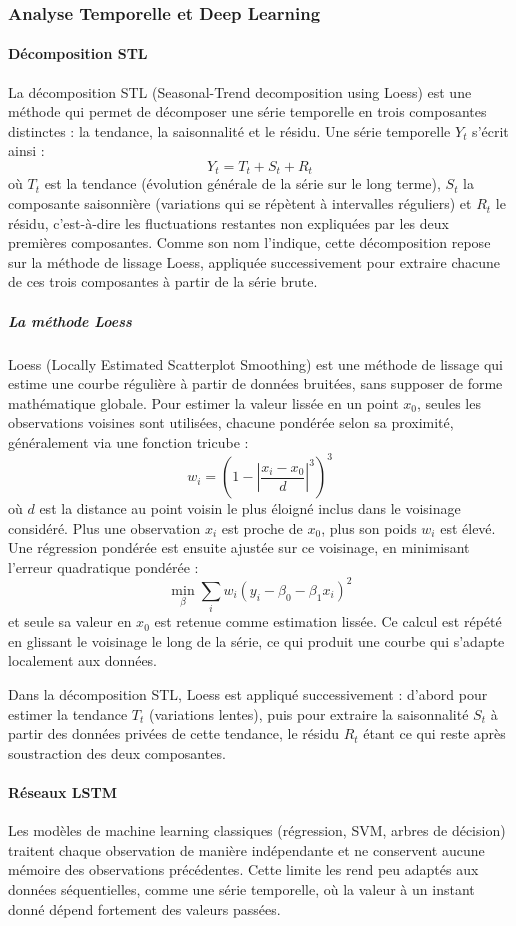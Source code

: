 \documentclass[a4paper,12pt, oneside]{article}
\begin{document}
\subsubsection{Analyse Temporelle et Deep Learning}
\paragraph{Décomposition STL\\}
La décomposition STL (Seasonal-Trend decomposition using Loess) est une méthode qui permet de décomposer une série temporelle en trois composantes distinctes : la tendance, la saisonnalité et le résidu. Une série temporelle $Y_t$ s'écrit ainsi :
\[
Y_t = T_t + S_t + R_t
\]
où $T_t$ est la tendance (évolution générale de la série sur le long terme), $S_t$ la composante saisonnière (variations qui se répètent à intervalles réguliers) et $R_t$ le résidu, c'est-à-dire les fluctuations restantes non expliquées par les deux premières composantes. Comme son nom l'indique, cette décomposition repose sur la méthode de lissage Loess, appliquée successivement pour extraire chacune de ces trois composantes à partir de la série brute.
\subparagraph{La méthode Loess\\}
Loess (Locally Estimated Scatterplot Smoothing) est une méthode de lissage qui estime une courbe régulière à partir de données bruitées, sans supposer de forme mathématique globale. Pour estimer la valeur lissée en un point $x_0$, seules les observations voisines sont utilisées, chacune pondérée selon sa proximité, généralement via une fonction tricube :
\[
w_i = \left(1 - \left|\frac{x_i - x_0}{d}\right|^3\right)^3
\]
où $d$ est la distance au point voisin le plus éloigné inclus dans le voisinage considéré. Plus une observation $x_i$ est proche de $x_0$, plus son poids $w_i$ est élevé. Une régression pondérée est ensuite ajustée sur ce voisinage, en minimisant l'erreur quadratique pondérée :
\[
\min_{\beta} \sum_{i} w_i \left(y_i - \beta_0 - \beta_1 x_i\right)^2
\]
et seule sa valeur en $x_0$ est retenue comme estimation lissée. Ce calcul est répété en glissant le voisinage le long de la série, ce qui produit une courbe qui s'adapte localement aux données.

Dans la décomposition STL, Loess est appliqué successivement : d'abord pour estimer la tendance $T_t$ (variations lentes), puis pour extraire la saisonnalité $S_t$ à partir des données privées de cette tendance, le résidu $R_t$ étant ce qui reste après soustraction des deux composantes.

\paragraph{Réseaux LSTM\\}
Les modèles de machine learning classiques (régression, SVM, arbres de décision) traitent chaque observation de manière indépendante et ne conservent aucune mémoire des observations précédentes. Cette limite les rend peu adaptés aux données séquentielles, comme une série temporelle, où la valeur à un instant donné dépend fortement des valeurs passées.
\end{document}
